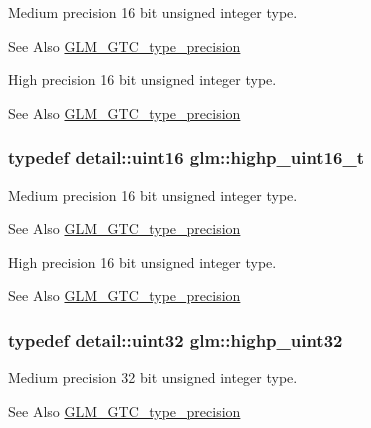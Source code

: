 Medium precision 16 bit unsigned integer type. \begin{DoxySeeAlso}{See Also}
\hyperlink{group__gtc__type__precision}{G\-L\-M\-\_\-\-G\-T\-C\-\_\-type\-\_\-precision}
\end{DoxySeeAlso}
High precision 16 bit unsigned integer type. \begin{DoxySeeAlso}{See Also}
\hyperlink{group__gtc__type__precision}{G\-L\-M\-\_\-\-G\-T\-C\-\_\-type\-\_\-precision} 
\end{DoxySeeAlso}
\hypertarget{group__gtc__type__precision_ga3145bc0ee80432c165e985a188a722b3}{
\subsubsection[{highp\-\_\-uint16\-\_\-t}]{\setlength{\rightskip}{0pt plus 5cm}typedef detail\-::uint16 {\bf glm\-::highp\-\_\-uint16\-\_\-t}}}\label{group__gtc__type__precision_ga3145bc0ee80432c165e985a188a722b3}
Medium precision 16 bit unsigned integer type. \begin{DoxySeeAlso}{See Also}
\hyperlink{group__gtc__type__precision}{G\-L\-M\-\_\-\-G\-T\-C\-\_\-type\-\_\-precision}
\end{DoxySeeAlso}
High precision 16 bit unsigned integer type. \begin{DoxySeeAlso}{See Also}
\hyperlink{group__gtc__type__precision}{G\-L\-M\-\_\-\-G\-T\-C\-\_\-type\-\_\-precision} 
\end{DoxySeeAlso}
\hypertarget{group__gtc__type__precision_ga3145e44c73e2df7dfe4f3cb65974bf22}{
\subsubsection[{highp\-\_\-uint32}]{\setlength{\rightskip}{0pt plus 5cm}typedef detail\-::uint32 {\bf glm\-::highp\-\_\-uint32}}}\label{group__gtc__type__precision_ga3145e44c73e2df7dfe4f3cb65974bf22}
Medium precision 32 bit unsigned integer type. \begin{DoxySeeAlso}{See Also}
\hyperlink{group__gtc__type__precision}{G\-L\-M\-\_\-\-G\-T\-C\-\_\-type\-\_\-precision}
\end{DoxySeeAlso}
